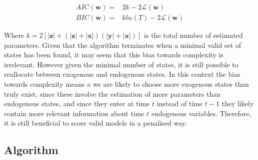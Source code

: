 \documentclass{article}
\begin{document}
\begin{align}
  AIC(\mathbf{w}) =& 2k - 2\mathcal{L}(\mathbf{w})\\
  BIC(\mathbf{w}) =& kln(T) - 2\mathcal{L}(\mathbf{w})
\end{align}

Where $k = 2[|\mathbf{z}| + (|\mathbf{z}| + |\mathbf{x}|)(|\mathbf{y}| + |\mathbf{x}|)]$ is the total number of estimated parameters. Given that the algorithm terminates when a minimal valid set of states has been found, it may seem that this bias towards complexity is irrelevant. However given the minimal number of states, it is still possible to reallocate between exogenous and endogenous states. In this context the bias towards complexity means a we are likely to choose more exogenous states than truly exist, since these involve the estimation of more parameters than endogenous states, and since they enter at time $t$ instead of time $t-1$ they likely contain more relevant information about time $t$ endogenous variables. Therefore, it is still beneficial to score valid models in a penalised way.

\subsection{Algorithm} \label{algo}
\end{document}
